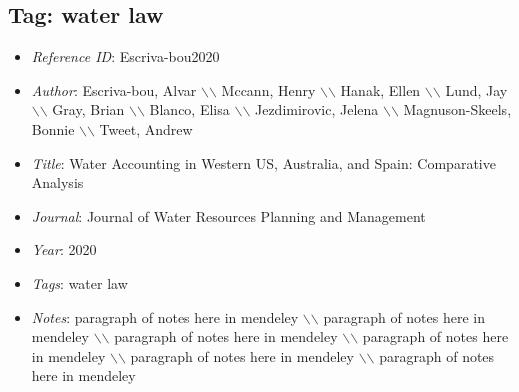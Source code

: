 \documentclass[11pt]{article}
\begin{document}
\subsection{Tag: water law} 
\noindent\citep{Escriva-bou2020} 
\begin{itemize} 
\item{\textit{Reference ID}:  Escriva-bou2020} 

\item{\textit{Author}:  Escriva-bou, Alvar $\backslash$$\backslash$ Mccann, Henry $\backslash$$\backslash$ Hanak, Ellen $\backslash$$\backslash$ Lund, Jay $\backslash$$\backslash$ Gray, Brian $\backslash$$\backslash$ Blanco, Elisa $\backslash$$\backslash$ Jezdimirovic, Jelena $\backslash$$\backslash$ Magnuson-Skeels, Bonnie $\backslash$$\backslash$ Tweet, Andrew} 

\item{\textit{Title}:  Water Accounting in Western US, Australia, and Spain: Comparative Analysis} 

\item{\textit{Journal}:  Journal of Water Resources Planning and Management} 

\item{\textit{Year}:  2020} 

\item{\textit{Tags}:  water law} 

\item{\textit{Notes}:  paragraph of notes here in mendeley $\backslash$$\backslash$ paragraph of notes here in mendeley $\backslash$$\backslash$ paragraph of notes here in mendeley $\backslash$$\backslash$ paragraph of notes here in mendeley $\backslash$$\backslash$ paragraph of notes here in mendeley $\backslash$$\backslash$ paragraph of notes here in mendeley} 

\end{itemize}\medskip
\end{document}
